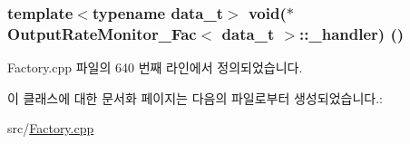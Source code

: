 \subsubsection[{\texorpdfstring{\+\_\+handler}{_handler}}]{\setlength{\rightskip}{0pt plus 5cm}template$<$typename data\+\_\+t$>$ void($\ast$ {\bf Output\+Rate\+Monitor\+\_\+\+Fac}$<$ data\+\_\+t $>$\+::\+\_\+handler) ()\hspace{0.3cm}{\ttfamily [private]}}\hypertarget{classOutputRateMonitor__Fac_a3bd9aaba10808157723d683f54141685}{}\label{classOutputRateMonitor__Fac_a3bd9aaba10808157723d683f54141685}


Factory.\+cpp 파일의 640 번째 라인에서 정의되었습니다.



이 클래스에 대한 문서화 페이지는 다음의 파일로부터 생성되었습니다.\+:\begin{DoxyCompactItemize}
\item 
src/\hyperlink{Factory_8cpp}{Factory.\+cpp}\end{DoxyCompactItemize}
